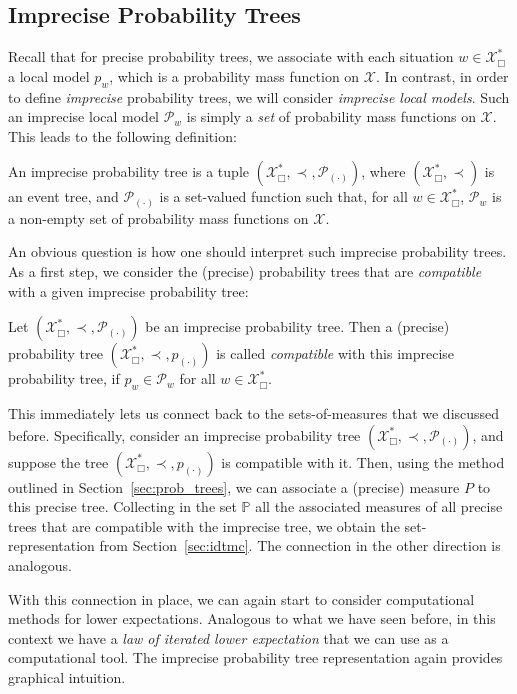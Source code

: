 \documentclass[graybox]{svmult}
\newcommand{\states}{\mathcal{X}}
\begin{document}
\subsection{Imprecise Probability Trees}\label{sec:imprecise_prob_tree}
Recall that for precise probability trees, we associate with each situation $w\in\states^*_\Box$ a local model $p_w$, which is a probability mass function on $\states$. In contrast, in order to define \emph{imprecise} probability trees, we will consider \emph{imprecise local models}. Such an imprecise local model $\mathcal{P}_w$ is simply a \emph{set} of probability mass functions on $\states$. This leads to the following definition:
\begin{definition}
An imprecise probability tree is a tuple $(\states^*_\Box,\prec,\mathcal{P}_{(\cdot)})$, where $(\states^*_\Box,\prec)$ is an event tree, and $\mathcal{P}_{(\cdot)}$ is a set-valued function such that, for all $w\in\states^*_\Box$, $\mathcal{P}_w$ is a non-empty set of probability mass functions on $\states$.
\end{definition}
An obvious question is how one should interpret such imprecise probability trees. As a first step, we consider the (precise) probability trees that are \emph{compatible} with a given imprecise probability tree:
\begin{definition}
Let $(\states^*_\Box,\prec,\mathcal{P}_{(\cdot)})$ be an imprecise probability tree. Then a (precise) probability tree $(\states^*_\Box,\prec,p_{(\cdot)})$ is called \emph{compatible} with this imprecise probability tree, if $p_w\in\mathcal{P}_w$ for all $w\in \states^*_\Box$.
\end{definition}

This immediately lets us connect back to the sets-of-measures that we discussed before. Specifically, consider an imprecise probability tree $(\states^*_\Box,\prec,\mathcal{P}_{(\cdot)})$, and suppose the tree $(\states^*_\Box,\prec,p_{(\cdot)})$ is compatible with it. Then, using the method outlined in Section~\ref{sec:prob_trees}, we can associate a (precise) measure $P$ to this precise tree. Collecting in the set $\mathbb{P}$ all the associated measures of all precise trees that are compatible with the imprecise tree, we obtain the set-representation from Section~\ref{sec:idtmc}. The connection in the other direction is analogous.

With this connection in place, we can again start to consider computational methods for lower expectations. Analogous to what we have seen before, in this context we have a \emph{law of iterated lower expectation} that we can use as a computational tool. The imprecise probability tree representation again provides graphical intuition.
\end{document}
